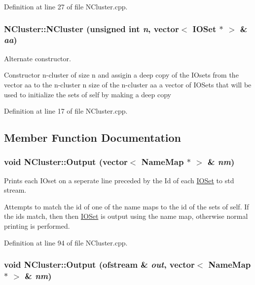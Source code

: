 Definition at line 27 of file NCluster.cpp.

\hypertarget{class_n_cluster_a5ef4833105e769e289f7e9dbf570dcef}{
\subsubsection[{NCluster}]{\setlength{\rightskip}{0pt plus 5cm}NCluster::NCluster (unsigned int {\em n}, \/  vector$<$ {\bf IOSet} $\ast$ $>$ \& {\em aa})}}
\label{class_n_cluster_a5ef4833105e769e289f7e9dbf570dcef}


Alternate constructor. 

Constructor n-\/cluster of size n and assigin a deep copy of the IOsets from the vector aa to the n-\/cluster  n size of the n-\/cluster  aa a vector of IOSets that will be used to initialize the sets of self by making a deep copy 

Definition at line 17 of file NCluster.cpp.



\subsection{Member Function Documentation}
\hypertarget{class_n_cluster_a762a3beaf5aa389d8afccabe227d30e3}{
\subsubsection[{Output}]{\setlength{\rightskip}{0pt plus 5cm}void NCluster::Output (vector$<$ {\bf NameMap} $\ast$ $>$ \& {\em nm})}}
\label{class_n_cluster_a762a3beaf5aa389d8afccabe227d30e3}


Prints each IOset on a seperate line preceded by the Id of each \hyperlink{class_i_o_set}{IOSet} to std stream. 

Attempts to match the id of one of the name maps to the id of the sets of self. If the ids match, then then \hyperlink{class_i_o_set}{IOSet} is output using the name map, otherwise normal printing is performed. 

Definition at line 94 of file NCluster.cpp.

\hypertarget{class_n_cluster_a5f75034c596cda89b823bb842f54019e}{
\subsubsection[{Output}]{\setlength{\rightskip}{0pt plus 5cm}void NCluster::Output (ofstream \& {\em out}, \/  vector$<$ {\bf NameMap} $\ast$ $>$ \& {\em nm})}}
\label{class_n_cluster_a5f75034c596cda89b823bb842f54019e}



